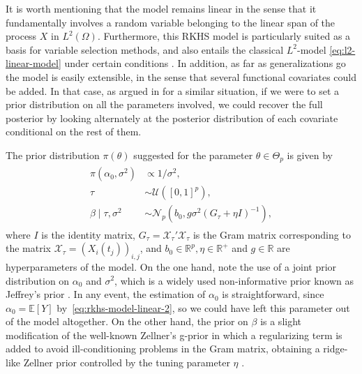 \documentclass[ba]{imsart}
\numberwithin{equation}{section}
\theoremstyle{plain}
\newcommand{\R}{\mathbb{R}}
\newcommand{\E}{\mathbb{E}}
\begin{document}
It is worth mentioning that the model remains linear in the sense that it fundamentally involves a random variable belonging to the linear span of the process \(X\) in \(L^2(\Omega)\). Furthermore, this RKHS model is particularly suited as a basis for variable selection methods, and also entails the classical \(L^2\)-model \eqref{eq:l2-linear-model} under certain conditions \citep[see][Sec.~3]{berrendero2020general}. In addition, as far as generalizations go the model is easily extensible, in the sense that several functional covariates could be added. In that case, as argued in \citet{grollemund2019bayesian} for a similar situation, if we were to set a prior distribution on all the parameters involved, we could recover the full posterior by looking alternately at the posterior distribution of each covariate conditional on the rest of them.

The prior distribution \(\pi(\theta)\) suggested for the parameter \(\theta \in \Theta_p\) is given by
\begin{align}\label{eq:prior-linear}
  \begin{split}
  \pi(\alpha_0, \sigma^2)              & \propto 1/\sigma^2,                                                     \\
  \tau                     & \sim \mathcal U([0, 1]^p),                                              \\
  \beta\mid \tau, \sigma^2 & \sim \mathcal N_p(b_0, g\sigma^2(G_\tau + \eta I)^{-1}),
\end{split}
\end{align}
where \(I\) is the identity matrix, \(G_\tau = \mathcal X_\tau'\mathcal X_\tau\) is the Gram matrix corresponding to the matrix \(\mathcal X_\tau = (X_i(t_j))_{i,j}\), and \(b_0\in \R^p, \eta \in \R^+\) and \(g\in \R\) are hyperparameters of the model. On the one hand, note the use of a joint prior distribution on \(\alpha_0\) and \(\sigma^2\), which is a widely used non-informative prior known as Jeffrey's prior \citep{jeffreys1946invariant}. In any event, the estimation of \(\alpha_0\) is straightforward, since \(\alpha_0 = \E[Y]\) by~\eqref{eq:rkhs-model-linear-2}, so we could have left this parameter out of the model altogether. On the other hand, the prior on \(\beta\) is a slight modification of the well-known Zellner's g-prior \citep{zellner1986assessing} in which a regularizing term is added to avoid ill-conditioning problems in the Gram matrix, obtaining a ridge-like Zellner prior controlled by the tuning parameter \(\eta\) \citep{baragatti2012study}.
\end{document}
